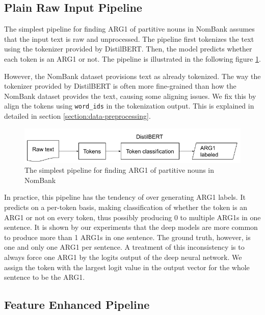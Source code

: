\documentclass[11pt]{article}
\begin{document}
\subsection{Plain Raw Input Pipeline}
\label{section:plain-pipeline}

The simplest pipeline for finding ARG1 of partitive nouns in NomBank assumes that the input text is raw and unprocessed. The pipeline first tokenizes the text using the tokenizer provided by DistilBERT. Then, the model predicts whether each token is an ARG1 or not. The pipeline is illustrated in the following figure \ref{fig:simplest-arg1-pipeline}.

However, the NomBank dataset provisions text as already tokenized. The way the tokenizer provided by DistilBERT is often more fine-grained than how the NomBank dataset provides the text, causing some aligning issues. We fix this by align the tokens using \verb|word_ids| in the tokenization output. This is explained in detailed in section \ref{section:data-preprocessing}.

\begin{figure}[h]
  \centering
  \includegraphics[width=\linewidth]{assets/simplest-arg1-pipeline.png}
  \caption{The simplest pipeline for finding ARG1 of partitive nouns in NomBank}
  \label{fig:simplest-arg1-pipeline}
\end{figure}

In practice, this pipeline has the tendency of over generating ARG1 labels. It predicts on a per-token basis, making classification of whether the token is an ARG1 or not on every token, thus possibly producing 0 to multiple ARG1s in one sentence. It is shown by our experiments that the deep models are more common to produce more than 1 ARG1s in one sentence. The ground truth, however, is one and only one ARG1 per sentence. A treatment of this inconsistency is to always force one ARG1 by the logits output of the deep neural network. We assign the token with the largest logit value in the output vector for the whole sentence to be the ARG1.

\subsection{Feature Enhanced Pipeline}
\end{document}
